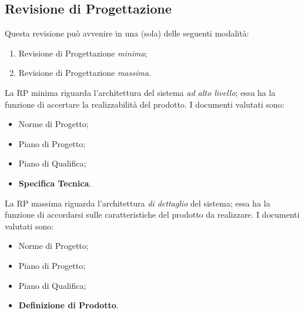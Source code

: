 \documentclass[a4paper]{article}
\begin{document}
		
	\subsection{Revisione di Progettazione}

		
Questa revisione può avvenire in una (sola) delle seguenti modalità:
		
	\begin{enumerate}
		
			
	\item Revisione di Progettazione \emph{minima};
			
	\item Revisione di Progettazione \emph{massima}.
		
	\end{enumerate}

		
La RP minima riguarda l'architettura del sistema \emph{ad alto livello}; essa ha la funzione di accertare la realizzabilità del prodotto. I documenti valutati sono:
		
	\begin{itemize}
		
			
	\item Norme di Progetto;
			
	\item Piano di Progetto;
			
	\item Piano di Qualifica;
			
	\item \textbf{Specifica Tecnica}.
		
	\end{itemize}

		
La RP massima riguarda l'architettura \emph{di dettaglio} del sistema; essa ha la funzione di accordarsi sulle caratteristiche del prodotto da realizzare. I documenti valutati sono:
		
	\begin{itemize}
		
			
	\item Norme di Progetto;
			
	\item Piano di Progetto;
			
	\item Piano di Qualifica;
			
	\item \textbf{Definizione di Prodotto}.
		
	\end{itemize}
\end{document}
